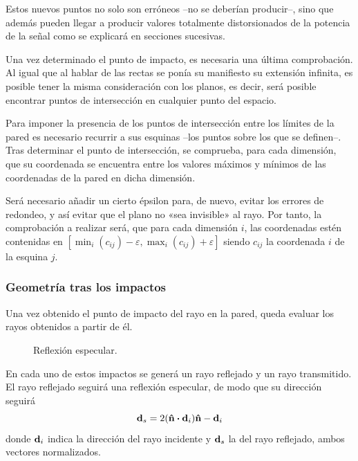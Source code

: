Estos nuevos puntos no solo son erróneos --no se deberían producir--, sino que además pueden llegar a producir valores totalmente distorsionados de la potencia de la señal como se explicará en secciones sucesivas.

Una vez determinado el punto de impacto, es necesaria una última comprobación.
Al igual que al hablar de las rectas se ponía su manifiesto su extensión infinita, es posible tener la misma consideración con los planos, es decir, será posible encontrar puntos de intersección en cualquier punto del espacio.

Para imponer la presencia de los puntos de intersección entre los límites de la pared es necesario recurrir a sus esquinas --los puntos sobre los que se definen--.
Tras determinar el punto de intersección, se comprueba, para cada dimensión, que su coordenada se encuentra entre los valores máximos y mínimos de las coordenadas de la pared en dicha dimensión.

Será necesario añadir un cierto épsilon para, de nuevo, evitar los errores de redondeo, y así evitar que el plano no «sea invisible» al rayo.
Por tanto, la comprobación a realizar será, que para cada dimensión $i$, las coordenadas estén contenidas en $[\min_i(c_{ij})-\varepsilon, \max_i(c_{ij})+\varepsilon]$ siendo $c_{ij}$ la coordenada $i$ de la esquina $j$.

\subsubsection*{Geometría tras los impactos}

Una vez obtenido el punto de impacto del rayo en la pared, queda evaluar los rayos obtenidos a partir de él.

\begin{figure}
    \vspace*{-0.75cm}
    \centering
    
    \caption{Reflexión especular.}
    \label{fig:reflexion}
\end{figure}
En cada uno de estos impactos se generá un rayo reflejado y un rayo transmitido.
El rayo reflejado seguirá una reflexión especular, de modo que su dirección seguirá
\begin{equation}
    \label{eq:reflexion}
    \vb{d}_s = 2(\vu{n} \vdot \vb{d}_i)\vu{n} - \vb{d}_i
\end{equation}
donde $\vb{d}_i$ indica la dirección del rayo incidente y $\vb{d}_s$ la del rayo reflejado, ambos vectores normalizados.

